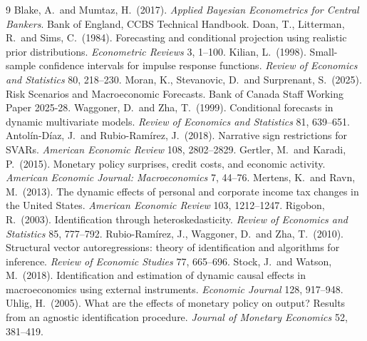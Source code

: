 \documentclass[11pt]{article}
\theoremstyle{remark}
\begin{document}
\begin{thebibliography}{9}
 Blake, A.\ and Mumtaz, H.\ (2017). \emph{Applied Bayesian
Econometrics for Central Bankers}. Bank of England, CCBS Technical Handbook.
 Doan, T., Litterman, R.\ and Sims, C.\ (1984). Forecasting and
conditional projection using realistic prior distributions. \emph{Econometric
Reviews} 3, 1--100.
 Kilian, L.\ (1998). Small-sample confidence intervals for
impulse response functions. \emph{Review of Economics and Statistics} 80, 218--230.
 Moran, K., Stevanovic, D.\ and Surprenant, S.\ (2025). Risk
Scenarios and Macroeconomic Forecasts. Bank of Canada Staff Working Paper 2025-28.
 Waggoner, D.\ and Zha, T.\ (1999). Conditional forecasts in
dynamic multivariate models. \emph{Review of Economics and Statistics} 81, 639--651.
 Antol\'in-D\'iaz, J.\ and Rubio-Ram\'irez, J.\ (2018). Narrative sign restrictions for SVARs. \emph{American Economic Review} 108, 2802--2829.
 Gertler, M.\ and Karadi, P.\ (2015). Monetary policy surprises, credit costs, and economic activity. \emph{American Economic Journal: Macroeconomics} 7, 44--76.
 Mertens, K.\ and Ravn, M.\ (2013). The dynamic effects of personal and corporate income tax changes in the United States. \emph{American Economic Review} 103, 1212--1247.
 Rigobon, R.\ (2003). Identification through heteroskedasticity. \emph{Review of Economics and Statistics} 85, 777--792.
 Rubio-Ram\'irez, J., Waggoner, D.\ and Zha, T.\ (2010). Structural vector autoregressions: theory of identification and algorithms for inference. \emph{Review of Economic Studies} 77, 665--696.
 Stock, J.\ and Watson, M.\ (2018). Identification and estimation of dynamic causal effects in macroeconomics using external instruments. \emph{Economic Journal} 128, 917--948.
 Uhlig, H.\ (2005). What are the effects of monetary policy on output? Results from an agnostic identification procedure. \emph{Journal of Monetary Economics} 52, 381--419.
\end{thebibliography}
\end{document}
